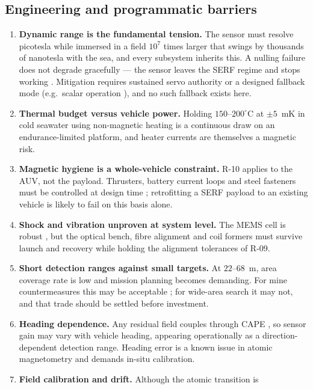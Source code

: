\documentclass[11pt]{article}
\begin{document}
\subsection{Engineering and programmatic barriers}
\begin{enumerate}[leftmargin=1.5em]
\item \textbf{Dynamic range is the fundamental tension.} The sensor must resolve
picotesla while immersed in a field $10^{7}$ times larger \cite{ncei} that swings
by thousands of nanotesla with the sea, and every subsystem inherits this. A
nulling failure does not degrade gracefully --- the sensor leaves the SERF regime
and stops working \cite{allred2002,borna2022}. Mitigation requires sustained servo
authority or a designed fallback mode (e.g.\ scalar operation \cite{shah2007}),
and no such fallback exists here.
\item \textbf{Thermal budget versus vehicle power.} Holding $150$--$200^{\circ}$C
at $\pm5$~mK in cold seawater using non-magnetic heating
\cite{fang2015,griffith2010} is a continuous draw on an endurance-limited
platform, and heater currents are themselves a magnetic risk.
\item \textbf{Magnetic hygiene is a whole-vehicle constraint.} R-10 applies to the
AUV, not the payload. Thrusters, battery current loops and steel fasteners must be
controlled at design time \cite{oehler2024}; retrofitting a SERF payload to an
existing vehicle is likely to fail on this basis alone.
\item \textbf{Shock and vibration unproven at system level.} The MEMS cell is
robust \cite{liew2004,griffith2010}, but the optical bench, fibre alignment and
coil formers must survive launch and recovery while holding the alignment
tolerances of R-09.
\item \textbf{Short detection ranges against small targets.} At $22$--$68$~m, area
coverage rate is low and mission planning becomes demanding. For mine
countermeasures this may be acceptable \cite{seidel2023}; for wide-area search it
may not, and that trade should be settled before investment.
\item \textbf{Heading dependence.} Any residual field couples through CAPE
\cite{borna2022}, so sensor gain may vary with vehicle heading, appearing
operationally as a direction-dependent detection range. Heading error is a known
issue in atomic magnetometry \cite{seltzer2008,alexandrov1995} and demands in-situ
calibration.
\item \textbf{Field calibration and drift.} Although the atomic transition is

\end{enumerate}
\end{document}
